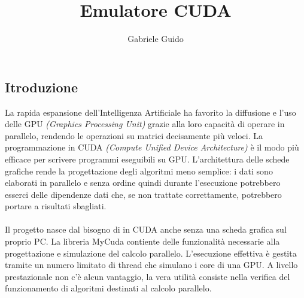 \documentclass[12pt]{article}
\author{Gabriele Guido}
\title{Emulatore CUDA}
\begin{document}
\maketitle
\clearpage
\begin{center}
    \section*{Itroduzione}
\end{center}
La rapida espansione dell'Intelligenza Artificiale ha favorito la diffusione e l'uso delle GPU 
\textit{(Graphics Processing Unit)} grazie alla loro capacità di operare in parallelo, rendendo le 
operazioni su matrici decisamente più veloci. 
La programmazione in CUDA \textit{(Compute Unified Device Architecture)} è il modo
più efficace per scrivere programmi eseguibili su GPU. L'architettura
delle schede grafiche rende la progettazione degli algoritmi meno semplice: i dati 
sono elaborati in parallelo e senza ordine quindi durante l'esecuzione potrebbero esserci delle dipendenze 
dati che, se non trattate correttamente, potrebbero portare a risultati sbagliati.
\\\\
Il progetto nasce dal bisogno di in CUDA anche senza una scheda grafica sul proprio PC. 
La libreria MyCuda contiente delle funzionalità 
necessarie alla progettazione e simulazione del calcolo parallelo. L'esecuzione 
effettiva è gestita tramite un numero limitato di thread che simulano i core di una GPU. A 
livello prestazionale non c'è alcun vantaggio, la vera utilità consiste nella verifica 
del funzionamento di algoritmi destinati al calcolo parallelo.
    
\end{document}
